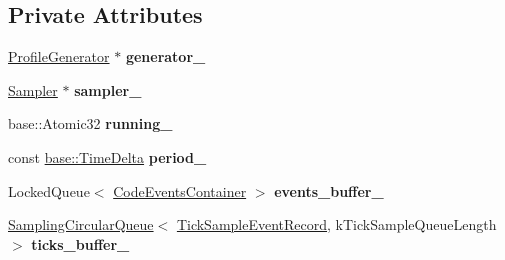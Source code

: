 \subsection*{Private Attributes}
\begin{DoxyCompactItemize}
\item 
\hyperlink{classv8_1_1internal_1_1_profile_generator}{Profile\+Generator} $\ast$ {\bfseries generator\+\_\+}\hypertarget{classv8_1_1internal_1_1_profiler_events_processor_abe12f8408ec5537032a7bc52b8b3c207}{}\label{classv8_1_1internal_1_1_profiler_events_processor_abe12f8408ec5537032a7bc52b8b3c207}

\item 
\hyperlink{classv8_1_1internal_1_1_sampler}{Sampler} $\ast$ {\bfseries sampler\+\_\+}\hypertarget{classv8_1_1internal_1_1_profiler_events_processor_aab2dd0f79821259ee2163ec7eac25e1a}{}\label{classv8_1_1internal_1_1_profiler_events_processor_aab2dd0f79821259ee2163ec7eac25e1a}

\item 
base\+::\+Atomic32 {\bfseries running\+\_\+}\hypertarget{classv8_1_1internal_1_1_profiler_events_processor_a9d4c8ef93827a88a7d974f818bc9f3d2}{}\label{classv8_1_1internal_1_1_profiler_events_processor_a9d4c8ef93827a88a7d974f818bc9f3d2}

\item 
const \hyperlink{classv8_1_1base_1_1_time_delta}{base\+::\+Time\+Delta} {\bfseries period\+\_\+}\hypertarget{classv8_1_1internal_1_1_profiler_events_processor_a655941b730668855ee139d110da67aab}{}\label{classv8_1_1internal_1_1_profiler_events_processor_a655941b730668855ee139d110da67aab}

\item 
Locked\+Queue$<$ \hyperlink{classv8_1_1internal_1_1_code_events_container}{Code\+Events\+Container} $>$ {\bfseries events\+\_\+buffer\+\_\+}\hypertarget{classv8_1_1internal_1_1_profiler_events_processor_a665cf1c8f1c968e7e3737f49f8c30d22}{}\label{classv8_1_1internal_1_1_profiler_events_processor_a665cf1c8f1c968e7e3737f49f8c30d22}

\item 
\hyperlink{classv8_1_1internal_1_1_sampling_circular_queue}{Sampling\+Circular\+Queue}$<$ \hyperlink{classv8_1_1internal_1_1_tick_sample_event_record}{Tick\+Sample\+Event\+Record}, k\+Tick\+Sample\+Queue\+Length $>$ {\bfseries ticks\+\_\+buffer\+\_\+}\hypertarget{classv8_1_1internal_1_1_profiler_events_processor_ae469aa5921951b1449742f56c07cfaf2}{}\label{classv8_1_1internal_1_1_profiler_events_processor_ae469aa5921951b1449742f56c07cfaf2}


\end{DoxyCompactItemize}
